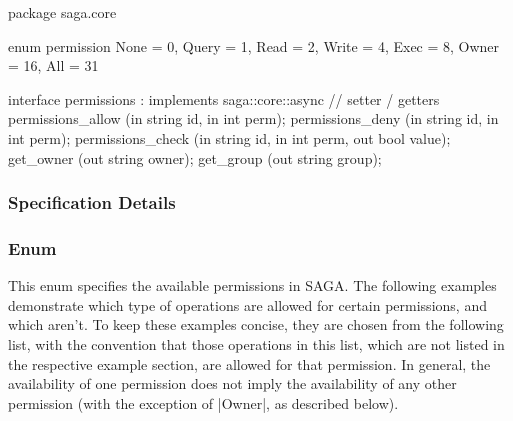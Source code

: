  \begin{myspec}
  package saga.core
  {
    enum permission
    {
      None      =  0,
      Query     =  1,
      Read      =  2,
      Write     =  4,
      Exec      =  8,
      Owner     = 16,
      All       = 31
    }
 
    interface permissions : implements saga::core::async
    {
      // setter / getters
      permissions_allow       (in  string          id,
                               in  int             perm);
      permissions_deny        (in  string          id,
                               in  int             perm);
      permissions_check       (in  string          id,
                               in  int             perm,
                               out bool            value);
      get_owner               (out string          owner);
      get_group               (out string          group);
    }
  }
 \end{myspec}
 
 
 \subsubsection{Specification Details}
 
 \subsubsection*{Enum }
 
  This enum specifies the available permissions in SAGA.  The
  following examples demonstrate which type of operations are
  allowed for certain permissions, and which aren't.  To keep
  these examples concise, they are chosen from the following
  list, with the convention that those operations in this list,
  which are not listed in the respective example section, are
   allowed for that permission.  In general, the
  availability of one permission does not imply the availability
  of any other permission (with the exception of |Owner|, as
  described below).
 
